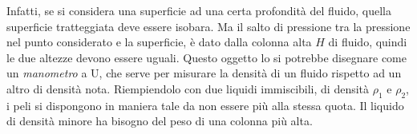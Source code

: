 \FloatBarrier
Infatti, se si considera una superficie ad una certa profondità del fluido, quella superficie tratteggiata deve essere isobara. Ma il salto di pressione tra la pressione nel punto considerato e la superficie, è dato dalla colonna alta $H$ di fluido, quindi le due altezze devono essere uguali. Questo oggetto lo si potrebbe disegnare come un \emph{manometro} a U, che serve per misurare la densità di un fluido rispetto ad un altro di densità nota. Riempiendolo con due liquidi immiscibili, di densità $\rho_1$ e $\rho_2$, i peli si dispongono in maniera tale da non essere più alla stessa quota. Il liquido di densità minore ha bisogno del peso di una colonna più alta.

\begin{figure}[htpb]
	\centering


	\begin{tikzpicture}[x=0.75pt,y=0.75pt,yscale=-1,xscale=1]


\end{tikzpicture}
\end{figure}
